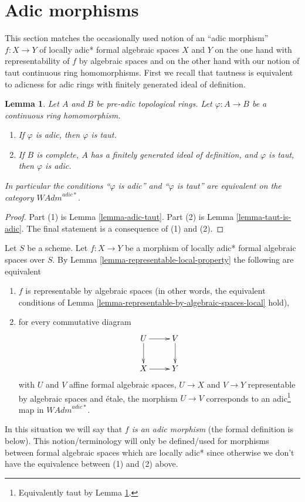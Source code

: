 \documentclass{stacks-project}
\theoremstyle{plain}
\newtheorem{lemma}[subsection]{Lemma}
\theoremstyle{definition}
\theoremstyle{remark}
\numberwithin{equation}{subsection}
\begin{document}
\section{Adic morphisms}
\label{section-adic}

\noindent
This section matches the occasionally used notion of an
``adic morphism'' $f : X \to Y$ of locally adic* formal algebraic spaces
$X$ and $Y$ on the one hand with representability of $f$ by
algebraic spaces and on the other hand with our notion of
taut continuous ring homomorphisms. First we recall that
tautness is equivalent to adicness for adic rings with finitely
generated ideal of definition.

\begin{lemma}
\label{lemma-adic-homomorphism}
Let $A$ and $B$ be pre-adic topological rings. Let
$\varphi : A \to B$ be a continuous ring homomorphism.
\begin{enumerate}
\item If $\varphi$ is adic, then $\varphi$ is taut.
\item If $B$ is complete, $A$ has a finitely generated
ideal of definition, and $\varphi$ is taut, then $\varphi$ is adic.
\end{enumerate}
In particular the conditions ``$\varphi$ is adic'' and ``$\varphi$ is taut''
are equivalent on the category $\textit{WAdm}^{adic*}$.
\end{lemma}

\begin{proof}
Part (1) is Lemma \ref{lemma-adic-taut}.
Part (2) is Lemma \ref{lemma-taut-is-adic}.
The final statement is a consequence of (1) and (2).
\end{proof}

\noindent
Let $S$ be a scheme. Let $f : X \to Y$ be a morphism of
locally adic* formal algebraic spaces over $S$.
By Lemma \ref{lemma-representable-local-property}
the following are equivalent
\begin{enumerate}
\item $f$ is representable by algebraic spaces (in other words, the
equivalent conditions of
Lemma \ref{lemma-representable-by-algebraic-spaces-local} hold),
\item for every commutative diagram
$$
\xymatrix{
U \ar[d] \ar[r] & V \ar[d] \\
X \ar[r] & Y
}
$$
with $U$ and $V$ affine formal algebraic spaces, $U \to X$ and $V \to Y$
representable by algebraic spaces and \'etale, the morphism $U \to V$
corresponds to an adic\footnote{Equivalently taut by
Lemma \ref{lemma-adic-homomorphism}.} map in $\textit{WAdm}^{adic*}$.
\end{enumerate}
In this situation we will say that {\it $f$ is an adic morphism} (the formal
definition is below). This notion/terminology will only be defined/used
for morphisms between formal algebraic spaces which are locally adic*
since otherwise we don't have the equivalence between (1) and (2) above.
\end{document}
